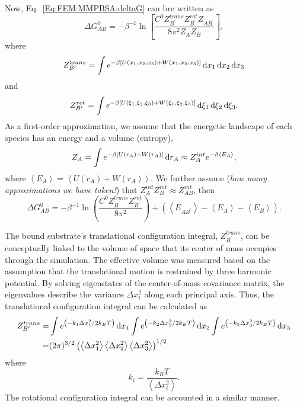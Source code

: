 Now, Eq.~\ref{Eq:FEM:MMPBSA:deltaG} can bre written as
\begin{equation}
   \Delta G_{AB}^0=-\beta^{-1}\ln{\left[\frac{C^0Z_{B^\prime}^{trans}Z_{B^\prime}^{rot}Z_{AB^\prime}}{8\pi^2Z_AZ_B}\right]},
\end{equation}
where
\begin{equation}
   Z_{B^\prime}^{trans}=\int e^{-\beta\left[U(x_1,x_2,x_3)+W(x_1,x_2,x_3)\right]}\mathop{}\!\mathrm{d} x_1\mathop{}\!\mathrm{d} x_2\mathop{}\!\mathrm{d} x_3
\end{equation}
and
\begin{equation}
	Z_{B^\prime}^{rot}=\int e^{-\beta\left[U(\xi_1,\xi_2,\xi_3)+W(\xi_1,\xi_2,\xi_3)\right]}\mathop{}\!\mathrm{d}\xi_1\mathop{}\!\mathrm{d}\xi_2\mathop{}\!\mathrm{d}\xi_3.
\end{equation}
As a first-order approximation, we assume that the energetic landscape of each species has an energy and a volume (entropy),
\begin{equation}
	Z_A=\int e^{-\beta \left[U(r_A)+W(r_A)\right]}\mathop{}\!\mathrm{d} r_A\approx Z_A^{int}e^{-\beta \left<E_A\right>},
\end{equation}
where $\left<E_A\right>=\left<U(r_A)+W(r_A)\right>$. We further assume (\textit{how many approximations we have taken!}) that $Z_A^{int}Z_B^{int}\approx Z_{AB}^{int}$,
then
\begin{equation}
	\Delta G_{AB}^0=-\beta^{-1}\ln{\left(\frac{C^0Z_{B^\prime}^{trans}Z_{B^\prime}^{rot}}{8\pi^2}\right)} +\left(\left<E_{AB^\prime}\right>-\left<E_A\right>-\left<E_B\right>\right).
\end{equation}
 
The bound substrate's translational configuration integral, $Z_{B^\prime}^{trans}$, can be conceptually linked to the volume of space that its center of mass occupies through the simulation. The effective volume was measured based on the assumption that the translational motion is restrained by three harmonic potential. By solving eigenstates of the center-of-mass covariance matrix, the eigenvalues describe the variance $\Delta x_i^2$ along each principal axis. Thus, the translational configuration integral can be calculated as
\begin{align}
Z_{B^\prime}^{trans}=&\int e^{\left(-k_1\Delta x_1^2/2k_BT\right)}\mathop{}\!\mathrm{d} x_1\int e^{\left(-k_2\Delta x_2^2/2k_BT\right)}\mathop{}\!\mathrm{d} x_2\int e^{\left(-k_3\Delta x_3^2/2k_BT\right)}\mathop{}\!\mathrm{d} x_3\notag\\
                    =&(2\pi)^{3/2}\left(\left<\Delta x_1^2\right>\left<\Delta x_2^2\right>\left<\Delta x_3^2\right>\right)^{1/2}
\end{align}
where
\begin{equation}
k_i=\frac{k_B T}{\left<\Delta x_i^2\right>}.
\end{equation}
The rotational configuration integral can be accounted in a similar manner.
